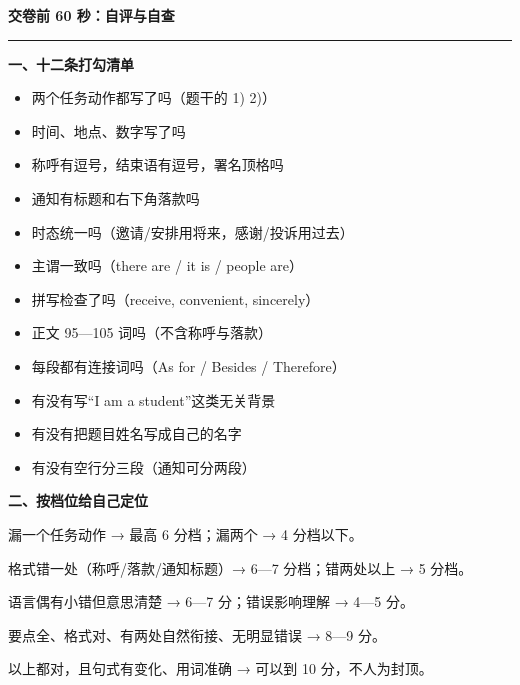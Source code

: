 \documentclass[11pt,a4paper]{ctexart}
\begin{document}
\clearpage
\vspace*{-4pt}
{\color{accent}\bfseries\LARGE 交卷前 60 秒：自评与自查}\par\vspace{3pt}
{\color{accent}\rule{\linewidth}{1.1pt}}\par
\vspace{6pt}

\noindent\begin{minipage}[t]{0.49\linewidth}\raggedright
{\color{accent}\bfseries 一、十二条打勾清单}\par
{\footnotesize\begin{itemize}[leftmargin=1.2em,itemsep=1.5pt,topsep=1pt,parsep=0pt]
\item[$\square$] 两个任务动作都写了吗（题干的 1) 2)）
\item[$\square$] 时间、地点、数字写了吗
\item[$\square$] 称呼有逗号，结束语有逗号，署名顶格吗
\item[$\square$] 通知有标题和右下角落款吗
\item[$\square$] 时态统一吗（邀请/安排用将来，感谢/投诉用过去）
\item[$\square$] 主谓一致吗（there are / it is / people are）
\item[$\square$] 拼写检查了吗（receive, convenient, sincerely）
\item[$\square$] 正文 95—105 词吗（不含称呼与落款）
\item[$\square$] 每段都有连接词吗（As for / Besides / Therefore）
\item[$\square$] 有没有写“I am a student”这类无关背景
\item[$\square$] 有没有把题目姓名写成自己的名字
\item[$\square$] 有没有空行分三段（通知可分两段）
\end{itemize}}
\end{minipage}\hfill
\begin{minipage}[t]{0.49\linewidth}\raggedright
{\color{accent}\bfseries 二、按档位给自己定位}\par
{\footnotesize
漏一个任务动作 → 最高 6 分档；漏两个 → 4 分档以下。\par\vspace{3pt}
格式错一处（称呼/落款/通知标题）→ 6—7 分档；错两处以上 → 5 分档。\par\vspace{3pt}
语言偶有小错但意思清楚 → 6—7 分；错误影响理解 → 4—5 分。\par\vspace{3pt}
要点全、格式对、有两处自然衔接、无明显错误 → 8—9 分。\par\vspace{3pt}
以上都对，且句式有变化、用词准确 → 可以到 10 分，不人为封顶。\par}
\end{minipage}\par
\end{document}
